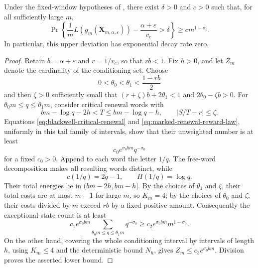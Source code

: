 \begin{proposition}
\label{prop:conditional-polynomial-upper-tail}
Under the fixed-window hypotheses of
, there exist \(\delta>0\) and
\(c>0\) such that, for all sufficiently large \(m\),
\[
 \Pr\left\{
  \frac1mL(g_m(\mathbf X_{m,\alpha,\varepsilon}))
  -\frac{\alpha+\varepsilon}{v_c}>\delta
 \right\}
 \ge c m^{1-\sigma_0}.
\]
In particular, this upper deviation has exponential decay rate zero.
\end{proposition}

\begin{proof}
Retain \(b=\alpha+\varepsilon\) and \(r=1/v_c\), so that \(rb<1\).
Fix \(h>0\), and let \(Z_m\) denote the cardinality of the conditioning set.
Choose
\[
 0<\theta_0<\theta_1<\frac{1-rb}{2}
\]
and then \(\zeta>0\) sufficiently small that
\((r+\zeta)b+2\theta_1<1\) and
\(2\theta_0-\zeta b>0\).  For
\(\theta_0m\le q\le\theta_1m\), consider critical renewal words with
\[
 bm-\log q-2h<T\le bm-\log q-h,
 \qquad |S/T-r|\le\zeta.
\]
Equations \eqref{eq:blackwell-critical-renewal} and
\eqref{eq:marked-renewal-reward-law}, uniformly in this tail family of
intervals, show that their unweighted number is at least
\[
 c_0e^{\sigma_0bm}q^{-\sigma_0}
\]
for a fixed \(c_0>0\).  Append to each word the letter \(1/q\).  The free-word
decomposition makes all resulting words distinct, while
\[
 c(1/q)=2q-1,
 \qquad H(1/q)=\log q.
\]
Their total energies lie in \((bm-2h,bm-h]\).  By the choices of
\(\theta_1\) and \(\zeta\), their total costs are at most \(m-1\) for large
\(m\), so \(K_m=4\); by the choices of \(\theta_0\) and \(\zeta\), their
costs divided by \(m\) exceed \(rb\) by a fixed positive amount.
Consequently the exceptional-state count is at least
\[
 c_1e^{\sigma_0bm}
 \sum_{\theta_0m\le q\le\theta_1m}q^{-\sigma_0}
 \ge c_2e^{\sigma_0bm}m^{1-\sigma_0}.
\]
On the other hand, covering the whole conditioning interval by intervals of
length \(h\), using \(K_m\le4\) and the deterministic bound \(N_h\), gives
\(Z_m\le c_3e^{\sigma_0bm}\).  Division proves the asserted lower bound.
\end{proof}

